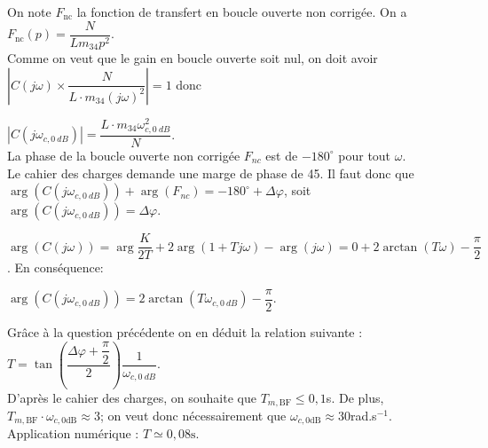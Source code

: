 \ifprof
\begin{corrige}
On note $F_{\text{nc}}$  la fonction de transfert en boucle ouverte non corrigée. On a $F_{\text{nc}}(p)=\dfrac{N}{Lm_{34}p^2}$.\\

Comme on veut que le gain en boucle ouverte soit nul, on doit avoir $\left|  C(j\omega)\times \dfrac{N}{L\cdot m_{34}(j\omega)^2}\right| = 1$ donc 

$\boxed{\left| C\left(j\omega_{c,\SI{0}{dB}}\right)\right| = \dfrac{L\cdot m_{34}\omega_{c,\SI{0}{dB}}^2}{N}}$.\\

La phase de la boucle ouverte non corrigée $F_{nc}$ est de $-180^{\circ}$ pour tout $\omega$.\\

Le cahier des charges demande une marge de phase de 45\degres. Il faut donc que 
$\arg\left(C\left(j\omega_{c,\SI{0}{dB}}\right)\right) + \arg(F_{nc}) =-180^{\circ} + \Delta\varphi$,
soit $\boxed{\arg\left(C\left(j\omega_{c,\SI{0}{dB}}\right)\right)=\Delta\varphi}$.
\end{corrige}
\else
\fi

\ifprof
\begin{corrige}
$\arg\left(C\left(j\omega\right)\right)=\arg{\dfrac{K}{2T}}+2\arg\left(1+Tj\omega\right)-\arg(j\omega)=0+2\arctan\left(T\omega\right)-\dfrac{\pi}{2}$. En conséquence:
  
$\arg\left(C\left(j\omega_{c,\SI{0}{dB}}\right)\right) = 2\arctan\left(T\omega_{c,\SI{0}{dB}}\right)-\dfrac{\pi}{2}$.

Grâce à la question précédente on en déduit la relation suivante : $\boxed{T=\tan\left(\dfrac{\Delta\varphi+\dfrac{\pi}{2}}{2}\right) \dfrac{1}{\omega_{c,\SI{0}{dB}}}}$.\\
D'après le cahier des charges, on souhaite que $T_{m,\text{BF}}\leq 0,1$s. De plus, $T_{m,\text{BF}}\cdot \omega_{c,0\text{dB}} \approx 3$; on veut donc nécessairement que $\omega_{c,0\text{dB}}\approx 30$rad.s$^{-1}$.\\
Application numérique : $\boxed{T \simeq 0,08\text{s}}$.

\end{corrige}
\else
\fi

